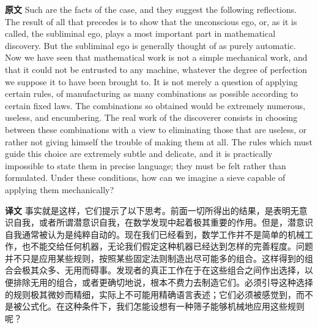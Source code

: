 \documentclass[UTF8,zihao=-4]{ctexart}
\newcommand{\BodyFont}{\fontsize{10.5pt}{15.5pt}\selectfont}
\newcommand{\origlabel}{\textbf{原文}\quad}
\newcommand{\translabel}{\textbf{译文}\quad}
\newenvironment{enblock}{\par\noindent\begingroup\BodyFont\origlabel}{\par\endgroup}
\newenvironment{zhblock}{\par\noindent\begingroup\BodyFont\translabel}{\par\endgroup\vspace{0.35em}}
\begin{document}
\begin{enblock}
Such are the facts of the case, and they suggest the following reflections. The result of all that precedes is to show that the unconscious ego, or, as it is called, the subliminal ego, plays a most important part in mathematical discovery. But the subliminal ego is generally thought of as purely automatic. Now we have seen that mathematical work is not a simple mechanical work, and that it could not be entrusted to any machine, whatever the degree of perfection we suppose it to have been brought to. It is not merely a question of applying certain rules, of manufacturing as many combinations as possible according to certain fixed laws. The combinations so obtained would be extremely numerous, useless, and encumbering. The real work of the discoverer consists in choosing between these combinations with a view to eliminating those that are useless, or rather not giving himself the trouble of making them at all. The rules which must guide this choice are extremely subtle and delicate, and it is practically impossible to state them in precise language; they must be felt rather than formulated. Under these conditions, how can we imagine a sieve capable of applying them mechanically?
\end{enblock}
\begin{zhblock}
事实就是这样，它们提示了以下思考。前面一切所得出的结果，是表明无意识自我，或者所谓潜意识自我，在数学发现中起着极其重要的作用。但是，潜意识自我通常被认为是纯粹自动的。现在我们已经看到，数学工作并不是简单的机械工作，也不能交给任何机器，无论我们假定这种机器已经达到怎样的完善程度。问题并不只是应用某些规则，按照某些固定法则制造出尽可能多的组合。这样得到的组合会极其众多、无用而碍事。发现者的真正工作在于在这些组合之间作出选择，以便排除无用的组合，或者更确切地说，根本不费力去制造它们。必须引导这种选择的规则极其微妙而精细，实际上不可能用精确语言表述；它们必须被感觉到，而不是被公式化。在这种条件下，我们怎能设想有一种筛子能够机械地应用这些规则呢？
\end{zhblock}
\end{document}
